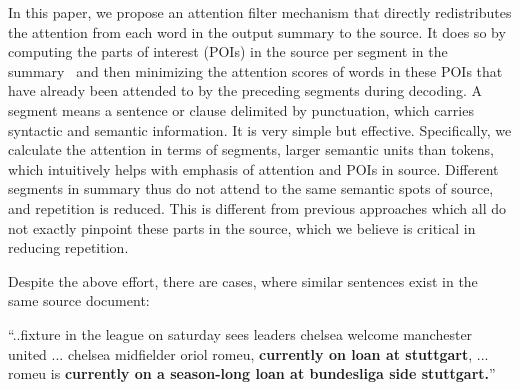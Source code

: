 In this paper, we propose an attention filter mechanism that directly 
redistributes the attention from each word in the output summary to the source. 
It does so by computing the parts of interest (POIs) in the source
per segment in the summary~
and then minimizing the attention scores of
words in these POIs that have already been attended to by the preceding 
segments during decoding. 
A segment means a sentence or clause delimited by punctuation,
which carries syntactic and semantic information. 
It is very simple but effective.
Specifically, we calculate the attention in terms of segments, larger semantic units than tokens, 
which intuitively helps with emphasis of attention and POIs in source.
Different segments in summary thus do not attend to the same semantic spots
of source, and repetition is reduced. 
This is different from previous approaches
which all do not exactly pinpoint these parts in the source,
which we believe is critical in reducing repetition. 

Despite the above effort, there are cases, where similar sentences 
exist in the same source document:
\begin{example}
\label{ex:repeatsrc}
\small{``..fixture in the league on saturday sees leaders 
	   chelsea welcome manchester united ... chelsea midfielder oriol romeu, 
\textbf{currently on loan at stuttgart}, ... romeu is 
\textbf{currently on a season-long loan at bundesliga side stuttgart.}''} 
\end{example}

